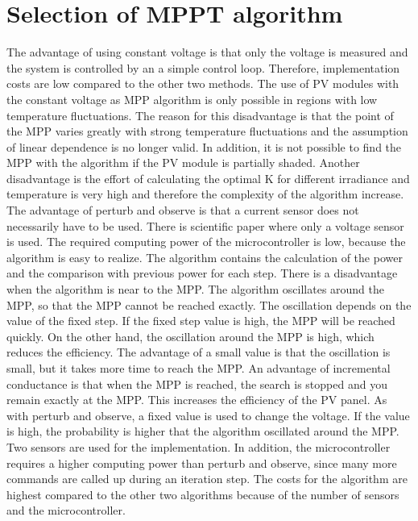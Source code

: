 \section{Selection of MPPT algorithm}\label{MPPTselection}

The advantage of using constant voltage is that only the voltage is measured and the system is controlled by an a simple control loop. Therefore, implementation costs are low compared to the other two methods. The use of PV modules with the constant voltage as MPP algorithm is only possible in regions with low temperature fluctuations. The reason for this disadvantage is that the point of the MPP varies greatly with strong temperature fluctuations and the assumption of linear dependence is no longer valid. In addition, it is not possible to find the MPP with the algorithm if the PV module is partially shaded. Another disadvantage is the effort of calculating the optimal K for different irradiance and temperature is very high and therefore the complexity of the algorithm increase. \newline 
The advantage of perturb and observe is that a current sensor does not necessarily have to be used. There is scientific paper where only a voltage sensor is used. \cite{} The required computing power of the microcontroller is low, because the algorithm is easy to realize. The algorithm contains the calculation of the power and the comparison with previous power for each step. There is a disadvantage when the algorithm is near to the MPP. The algorithm oscillates around the MPP, so that the MPP cannot be reached exactly. The oscillation depends on the value of the fixed step. If the fixed step value is high, the MPP will be reached quickly. On the other hand, the oscillation around the MPP is high, which reduces the efficiency. The advantage of a small value is that the oscillation is small, but it takes more time to reach the MPP. \newline
An advantage of incremental conductance is that when the MPP is reached, the search is stopped and you remain exactly at the MPP. This increases the efficiency of the PV panel. As with perturb and observe, a fixed value is used to change the voltage. If the value is high, the probability is higher that the algorithm oscillated around the MPP. 
Two sensors are used for the implementation. In addition, the microcontroller requires a higher computing power than perturb and observe, since many more commands are called up during an iteration step. The costs for the algorithm are highest compared to the other two algorithms because of the number of sensors and the microcontroller. \newline
